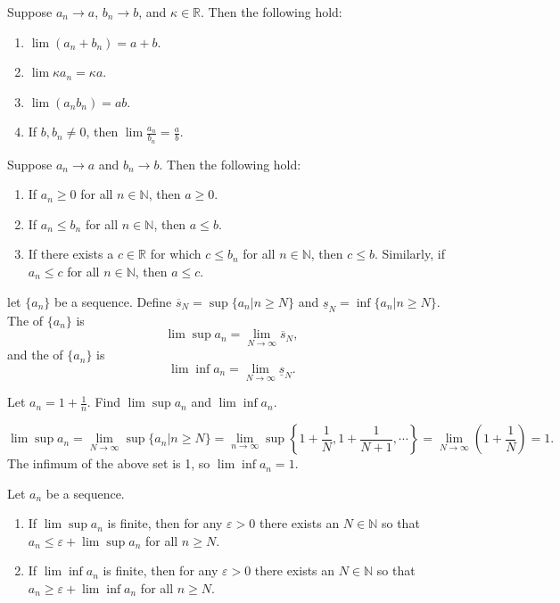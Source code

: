 \begin{theorem}
Suppose $a_n \rightarrow a$, $b_n \rightarrow b$, and $\kappa \in \mathbb{R}$. Then the following hold:
\begin{enumerate}
\item $\lim(a_n + b_n) = a+b$. 
\item $\lim \kappa a_n = \kappa a$. 
\item $\lim(a_nb_n) = ab$. 
\item If $b, b_n \neq 0$, then $\lim \frac{a_n}{b_n} = \frac{a}{b}$. 
\end{enumerate}
\end{theorem}
\newpage
\begin{theorem}
Suppose $a_n \rightarrow a$ and $b_n \rightarrow b$. Then the following hold:
\begin{enumerate}
\item If $a_n \geq 0$ for all $n \in \mathbb{N}$, then $a \geq 0$. 
\item If $a_n \leq b_n$ for all $n \in \mathbb{N}$, then $a \leq b$. 
\item If there exists a $c \in \mathbb{R}$ for which $c \leq b_n$ for all $n \in \mathbb{N}$, then $c \leq b$. Similarly, if $a_n \leq c$ for all $n \in \mathbb{N}$, then $a \leq c$. 
\end{enumerate}
\end{theorem}

\begin{definition}
let $\{a_n\}$ be a sequence. Define $\overline{s}_N = \sup{\{a_n | n \geq N\}}$ and $\underline{s}_N = \inf{\{a_n | n \geq N\}}$. The  of $\{a_n\}$ is $$ \lim\sup a_n = \lim_{N \to \infty} \overline{s}_N,$$ and the  of $\{a_n\}$ is $$ \lim\inf a_n = \lim_{N \to \infty} \underline{s}_N.$$
\end{definition}

\begin{example}
Let $a_n = 1 + \frac{1}{n}$. Find $\lim\sup a_n$ and $\lim\inf a_n$. 
\end{example}
\begin{soln}
$$\lim\sup a_n = \lim_{N \to \infty} \sup{\{a_n | n \geq N\}} = \lim_{n\to\infty} \sup{\left\{1 + \frac{1}{N}, 1 + \frac{1}{N+1}, \cdots\right \}} = \lim_{N\to\infty}(1 + \frac{1}{N}) = \boxed{1}.$$ The infimum of the above set is 1, so $\lim\inf a_n = \boxed{1}$. 
\end{soln}

\begin{theorem}
Let $a_n$ be a sequence. 
\begin{enumerate}
\item If $\lim\sup a_n$ is finite, then for any $\varepsilon > 0$ there exists an $N \in \mathbb{N}$ so that $a_n \leq \varepsilon + \lim\sup a_n$ for all $n \geq N$. 
\item If $\lim\inf a_n$ is finite, then for any $\varepsilon > 0$ there exists an $N \in \mathbb{N}$ so that $a_n \geq \varepsilon + \lim\inf a_n$ for all $n \geq N$. 
\end{enumerate}
\end{theorem}

